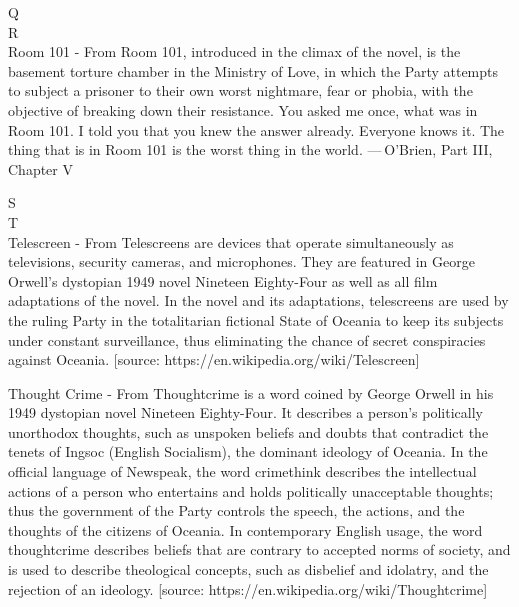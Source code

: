 \documentclass{article} %
\begin{document}
{  Q \\
  
  R \\
  
  Room 101 - From \NineteenEightyFour{} Room 101, introduced in the climax of the novel, is the basement torture chamber in the Ministry of Love, in which the Party attempts to subject a prisoner to their own worst nightmare, fear or phobia, with the objective of breaking down their resistance. \n \quote You asked me once, what was in Room 101. I told you that you knew the answer already. Everyone knows it. The thing that is in Room 101 is the worst thing in the world. \n \quoted — O'Brien, Part III, Chapter V
  
  S \\
  
  T \\
  
  Telescreen - From \NineteenEightyFour{} Telescreens are devices that operate simultaneously as televisions, security cameras, and microphones. They are featured in George Orwell's dystopian 1949 novel Nineteen Eighty-Four as well as all film adaptations of the novel. In the novel and its adaptations, telescreens are used by the ruling Party in the totalitarian fictional State of Oceania to keep its subjects under constant surveillance, thus eliminating the chance of secret conspiracies against Oceania. [source: https://en.wikipedia.org/wiki/Telescreen]
  
  Thought Crime - From \NineteenEightyFour{} Thoughtcrime is a word coined by George Orwell in his 1949 dystopian novel Nineteen Eighty-Four. It describes a person's politically unorthodox thoughts, such as unspoken beliefs and doubts that contradict the tenets of Ingsoc (English Socialism), the dominant ideology of Oceania. In the official language of Newspeak, the word crimethink describes the intellectual actions of a person who entertains and holds politically unacceptable thoughts; thus the government of the Party controls the speech, the actions, and the thoughts of the citizens of Oceania. In contemporary English usage, the word thoughtcrime describes beliefs that are contrary to accepted norms of society, and is used to describe theological concepts, such as disbelief and idolatry, and the rejection of an ideology. [source: https://en.wikipedia.org/wiki/Thoughtcrime]
  
}
\end{document}
